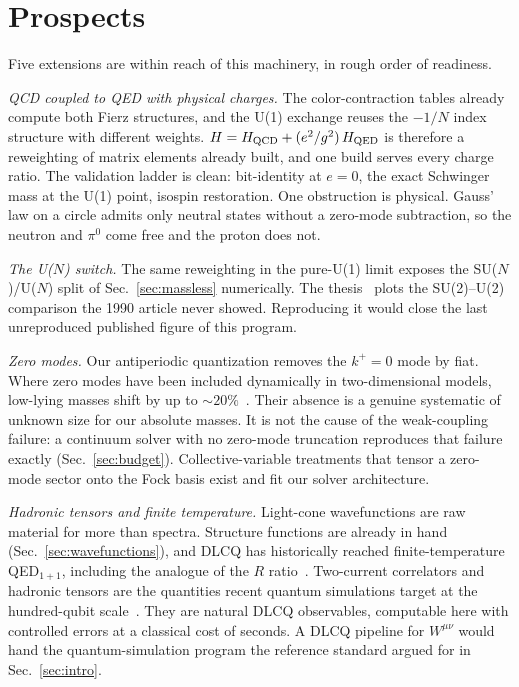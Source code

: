 \section{Prospects}
\label{sec:prospects}

Five extensions are within reach of this machinery, in rough order of
readiness.

\emph{QCD coupled to QED with physical charges.}  The color-contraction
tables already compute both Fierz structures, and the U(1) exchange reuses
the $-1/N$ index structure with different weights.
$H = H_{\rm QCD} + (e^2/g^2)\,H_{\rm QED}$ is therefore a reweighting of
matrix elements already built, and one build serves every charge ratio.
The validation ladder is clean: bit-identity at $e = 0$, the exact
Schwinger mass at the U(1) point, isospin restoration.  One obstruction is
physical.  Gauss' law on a circle admits only neutral states without a
zero-mode subtraction, so the neutron and $\pi^0$ come free and the proton
does not.

\emph{The U($N$) switch.}  The same reweighting in the pure-U(1) limit
exposes the SU($N$)/U($N$) split of Sec.~\ref{sec:massless} numerically.
The thesis~\cite{Hornbostel:1988ne} plots the SU(2)--U(2) comparison the
1990 article never showed.  Reproducing it would close the last
unreproduced published figure of this program.

\emph{Zero modes.}  Our antiperiodic quantization removes the $k^+ = 0$
mode by fiat.  Where zero modes have been included dynamically in
two-dimensional models, low-lying masses shift by up to
$\sim 20\%$~\cite{Mueller:1998tf}.  Their absence is a genuine systematic
of unknown size for our absolute masses.  It is not the cause of the
weak-coupling failure: a continuum solver with no zero-mode truncation
reproduces that failure exactly (Sec.~\ref{sec:budget}).
Collective-variable treatments that tensor a zero-mode sector onto the Fock
basis exist and fit our solver architecture.

\emph{Hadronic tensors and finite temperature.}  Light-cone wavefunctions
are raw material for more than spectra.  Structure functions are already in
hand (Sec.~\ref{sec:wavefunctions}), and DLCQ has historically reached
finite-temperature QED$_{1+1}$, including the analogue of the $R$
ratio~\cite{Strauss:2008zx,Strauss:2009zza}.  Two-current correlators and
hadronic tensors are the quantities recent quantum simulations target at
the hundred-qubit scale~\cite{Gustafson:2026ht}.  They are natural DLCQ
observables, computable here with controlled errors at a classical cost of
seconds.  A DLCQ pipeline for $W^{\mu\nu}$ would hand the
quantum-simulation program the reference standard argued for in
Sec.~\ref{sec:intro}.

